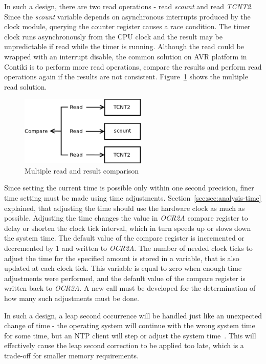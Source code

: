 In such a design, there are two read operations - read {\it{scount}} and read {\it{TCNT2}}.
Since the {\it{scount}} variable depends on asynchronous interrupts produced by
the clock module, querying the counter register causes a race condition.
The timer clock runs asynchronously from the CPU clock and
the result may be unpredictable if read while the timer is running.
Although the read could be wrapped with an interrupt disable,
the common solution on AVR platform in Contiki is to perform more read operations,
compare the results and perform read operations again if the results are not consistent.
Figure~\ref{fig:design-read} shows the multiple read solution.

\begin{figure}
  \centering
  \includegraphics[width=6cm,keepaspectratio]{fig/read.png}
  \caption{Multiple read and result comparison}
  \label{fig:design-read}
\end{figure}

Since setting the current time is possible only within one second precision,
finer time setting must be made using time adjustments.
Section~\ref{sec:sec:analysis-time} explained, that adjusting the time
should use the hardware clock as much as possible.
Adjusting the time changes the value in {\it{OCR2A}} compare register
to delay or shorten the clock tick interval,
which in turn speeds up or slows down the system time.
The default value of the compare register is incremented or decremented by 1
and written to {\it{OCR2A}}.
The number of needed clock ticks to adjust the time for the specified amount
is stored in a variable, that is also updated at each clock tick.
This variable is equal to zero when enough time adjustments were performed,
and the default value of the compare register is written back to {\it{OCR2A}}.
A new call must be developed for the determination of how many such adjustments must be done.

In such a design, a leap second occurrence will be handled just like an unexpected change of time -
the operating system will continue with the wrong system time for some time,
but an NTP client will step or adjust the system time~\cite{ntp-faq}.
This will effectively cause the leap second correction to be applied too late,
which is a trade-off for smaller memory requirements.


